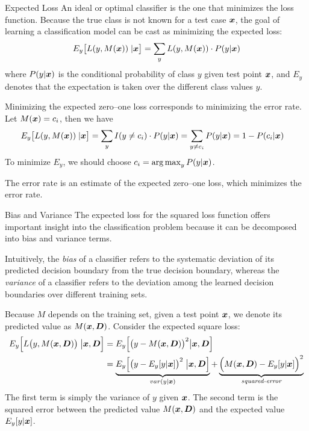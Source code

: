 \begin{frame}{Expected Loss}
An ideal or optimal
classif\/{i}er is the one that minimizes the loss function. Because
the true class is not known for a test case ${\boldsymbol x}$, the goal of
learning a classif\/{i}cation model can be cast as minimizing the
expected loss:
\begin{align*}
  E_y\bigl[L(y, M({\boldsymbol x})) \;| {\boldsymbol x}\bigr] =
  \sum_{y} L(y, M({\boldsymbol x})) \cdot P(y|{\boldsymbol x})
\end{align*}
where $P(y|{\boldsymbol x})$ is the conditional probability of class $y$ given
test point ${\boldsymbol x}$, and $E_y$ denotes
that the expectation is taken over the different
class values $y$.

\medskip
Minimizing the expected zero--one loss corresponds to minimizing
the error rate.
Let $M({\boldsymbol x}) =
c_i$, then we have
\begin{align*}
  E_y\bigl[L(y, M({\boldsymbol x})) \;| {\boldsymbol x}\bigr] &
  = \sum_{y} I(y \ne c_i) \cdot P(y|{\boldsymbol x})
   = \sum_{y \ne c_i} P(y|{\boldsymbol x})
   = 1 - P(c_i | {\boldsymbol x})
\end{align*}
To minimize $E_y$, we should choose 
$c_i =
\mathop{\arg\max}_{y} P(y|{\boldsymbol x})$. 

\medskip

The error rate is an
estimate of the expected zero--one loss, which
minimizes the error rate.
\end{frame}


\begin{frame}{Bias and Variance}
  \small
The expected loss for the squared loss function offers important
insight into the classif\/{i}cation problem because it can be
decomposed into bias and variance terms. 

\medskip
Intuitively, the {\em
bias} of a classif\/{i}er refers to the
systematic deviation of its predicted decision boundary from the
true decision boundary, whereas the {\em variance}
 of a classif\/{i}er refers to the
deviation among the learned decision boundaries over different
training sets. 

\medskip
Because
 $M$ depends on the training set, given a test point ${\boldsymbol x}$,
 we denote its predicted value as
 $M({\boldsymbol x}, {\boldsymbol D})$. Consider the expected square loss:
\begin{align*}
E_y\Bigl[ L\bigl(y,M({\boldsymbol x}, {\boldsymbol D})\bigr) \;\bigl| {\boldsymbol x}, {\boldsymbol D} \Bigr] 
  & = E_y\Bigl[ \bigl(y - M({\boldsymbol x}, {\boldsymbol D})\bigr)^2 \bigl| {\boldsymbol x},
  {\boldsymbol D}\Bigr]\\ 
  & =  \underbrace{E_y\Bigl[ \bigl(y - E_y[y|{\boldsymbol x}]\bigr)^2 \;
      \bigl| {\boldsymbol x}, {\boldsymbol D}\Bigr]}_{var(y|{\boldsymbol x})} +
    \underbrace{\Bigl(M({\boldsymbol x}, {\boldsymbol D}) -
    E_y[y|{\boldsymbol x}]\Bigr)^2}_{\textit{squared-error}}
\end{align*}
The f\/{i}rst term is simply the variance of $y$ given ${\boldsymbol x}$.
The second term
 is the squared error between the
predicted value $M({\boldsymbol x}, {\boldsymbol D})$ and the expected value $E_y[y|{\boldsymbol x}]$.
\end{frame}

